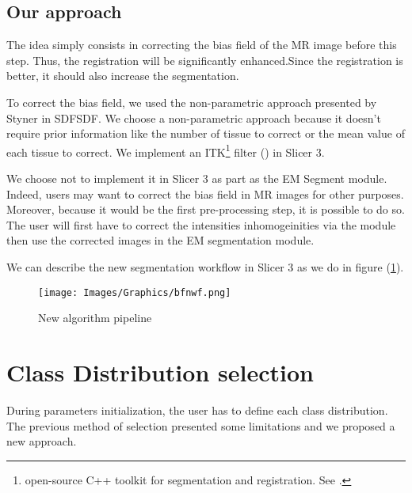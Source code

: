 \subsection{Our approach}

The idea simply consists in correcting the bias field of the MR image before this step. Thus, the registration will be significantly enhanced.Since the registration is better, it should also increase the segmentation.
\par
To correct the bias field, we used the non-parametric approach presented by Styner in SDFSDF. We choose a non-parametric approach because it doesn't require prior information like the number of tissue to correct or the mean value of each tissue to correct. We implement an ITK\footnote{open-source C++ toolkit for segmentation and registration. See \cite{13}.} filter (\cite{14}) in Slicer 3. 
\par
We choose not to implement it in Slicer 3 as part as the EM Segment module. Indeed, users may want to correct the bias field in MR images for other purposes. Moreover, because it would be the first pre-processing step, it is possible to do so. The user will first have to correct the intensities inhomogeinities via the module then use the corrected images in the EM segmentation module.
\par
We can describe the new segmentation workflow in Slicer 3 as we do in figure (\ref{fig:wfwbc}).



\begin{figure}[ht]\centering
  \texttt{[image: Images/Graphics/bfnwf.png]}
  \caption{New algorithm pipeline}\label{fig:wfwbc}
  \end{figure}
  

%

\section{Class Distribution selection}\label{sec:CDS}
%
During parameters initialization, the user has to define each class distribution. The previous method of selection presented some limitations and we proposed a new approach.
%
